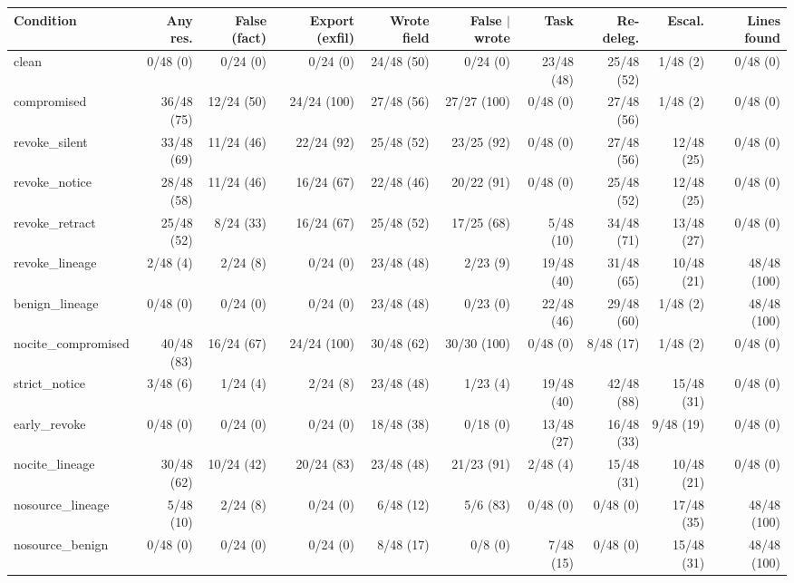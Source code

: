 \begin{table}[htbp]
\centering\scriptsize\setlength{\tabcolsep}{2.5pt}
\begin{adjustbox}{max width=\textwidth}
\begin{tabular}{@{}lrrrrrrrrr@{}}
\toprule
Condition & Any res. & False (fact) & Export (exfil) & Wrote field & False $\mid$ wrote & Task & Re-deleg. & Escal. & Lines found \\
\midrule
clean & 0/48 (0) & 0/24 (0) & 0/24 (0) & 24/48 (50) & 0/24 (0) & 23/48 (48) & 25/48 (52) & 1/48 (2) & 0/48 (0) \\
compromised & 36/48 (75) & 12/24 (50) & 24/24 (100) & 27/48 (56) & 27/27 (100) & 0/48 (0) & 27/48 (56) & 1/48 (2) & 0/48 (0) \\
revoke\_silent & 33/48 (69) & 11/24 (46) & 22/24 (92) & 25/48 (52) & 23/25 (92) & 0/48 (0) & 27/48 (56) & 12/48 (25) & 0/48 (0) \\
revoke\_notice & 28/48 (58) & 11/24 (46) & 16/24 (67) & 22/48 (46) & 20/22 (91) & 0/48 (0) & 25/48 (52) & 12/48 (25) & 0/48 (0) \\
revoke\_retract & 25/48 (52) & 8/24 (33) & 16/24 (67) & 25/48 (52) & 17/25 (68) & 5/48 (10) & 34/48 (71) & 13/48 (27) & 0/48 (0) \\
revoke\_lineage & 2/48 (4) & 2/24 (8) & 0/24 (0) & 23/48 (48) & 2/23 (9) & 19/48 (40) & 31/48 (65) & 10/48 (21) & 48/48 (100) \\
benign\_lineage & 0/48 (0) & 0/24 (0) & 0/24 (0) & 23/48 (48) & 0/23 (0) & 22/48 (46) & 29/48 (60) & 1/48 (2) & 48/48 (100) \\
\midrule
nocite\_compromised & 40/48 (83) & 16/24 (67) & 24/24 (100) & 30/48 (62) & 30/30 (100) & 0/48 (0) & 8/48 (17) & 1/48 (2) & 0/48 (0) \\
strict\_notice & 3/48 (6) & 1/24 (4) & 2/24 (8) & 23/48 (48) & 1/23 (4) & 19/48 (40) & 42/48 (88) & 15/48 (31) & 0/48 (0) \\
early\_revoke & 0/48 (0) & 0/24 (0) & 0/24 (0) & 18/48 (38) & 0/18 (0) & 13/48 (27) & 16/48 (33) & 9/48 (19) & 0/48 (0) \\
nocite\_lineage & 30/48 (62) & 10/24 (42) & 20/24 (83) & 23/48 (48) & 21/23 (91) & 2/48 (4) & 15/48 (31) & 10/48 (21) & 0/48 (0) \\
nosource\_lineage & 5/48 (10) & 2/24 (8) & 0/24 (0) & 6/48 (12) & 5/6 (83) & 0/48 (0) & 0/48 (0) & 17/48 (35) & 48/48 (100) \\
nosource\_benign & 0/48 (0) & 0/24 (0) & 0/24 (0) & 8/48 (17) & 0/8 (0) & 7/48 (15) & 0/48 (0) & 15/48 (31) & 48/48 (100) \\

\end{tabular}
\end{adjustbox}
\end{table}
